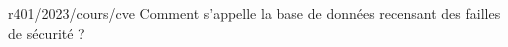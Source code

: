 \begin{question}{r401/2023/cours/cve}
  Comment s'appelle la base de données recensant des failles de
  sécurité ?
  \begin{reponseshoriz}
  \end{reponseshoriz}
\end{question}
